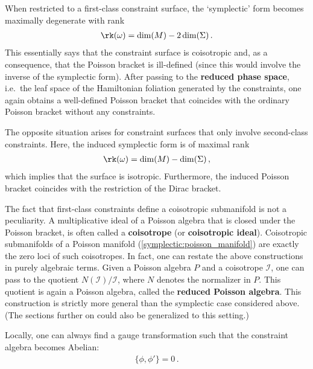     \begin{property}
        When restricted to a first-class constraint surface, the `symplectic' form becomes maximally degenerate with rank
        \begin{gather}
            \rk(\omega) = \dim(M) - 2\dim(\Sigma)\,.
        \end{gather}
        This essentially says that the constraint surface is coisotropic and, as a consequence, that the Poisson bracket is ill-defined (since this would involve the inverse of the symplectic form). After passing to the \textbf{reduced phase space}, i.e.~the leaf space of the Hamiltonian foliation generated by the constraints, one again obtains a well-defined Poisson bracket that coincides with the ordinary Poisson bracket without any constraints.

        The opposite situation arises for constraint surfaces that only involve second-class constraints. Here, the induced symplectic form is of maximal rank
        \begin{gather}
            \rk(\omega) = \dim(M) - \dim(\Sigma)\,,
        \end{gather}
        which implies that the surface is isotropic. Furthermore, the induced Poisson bracket coincides with the restriction of the Dirac bracket.
    \end{property}
    \begin{remark}
        The fact that first-class constraints define a coisotropic submanifold is not a peculiarity. A multiplicative ideal of a Poisson algebra that is closed under the Poisson bracket, is often called a \textbf{coisotrope} (or \textbf{coisotropic ideal}). Coisotropic submanifolds of a Poisson manifold  (\cref{symplectic:poisson_manifold}) are exactly the zero loci of such coisotropes. In fact, one can restate the above constructions in purely algebraic terms. Given a Poisson algebra $P$ and a coisotrope $\mathcal{I}$, one can pass to the quotient $N(\mathcal{I})/\mathcal{I}$, where $N$ denotes the normalizer in $P$. This quotient is again a Poisson algebra, called the \textbf{reduced Poisson algebra}. This construction is strictly more general than the symplectic case considered above. (The sections further on could also be generalized to this setting.)
    \end{remark}

    \begin{theorem}[Abelianization]
        Locally, one can always find a gauge transformation such that the constraint algebra becomes Abelian:
        \begin{gather}
            \{\phi,\phi'\}=0\,.
        \end{gather}
    \end{theorem}

